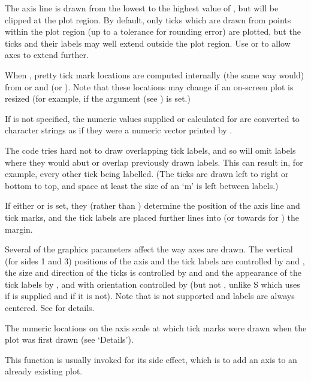 \begin{Details}\relax
The axis line is drawn from the lowest to the highest value of
, but will be clipped at the plot region.  By default, only
ticks which are drawn from points within the plot region (up to a
tolerance for rounding error) are plotted, but the ticks and their
labels may well extend outside the plot region.  Use 
or  to allow axes to extend further.

When , pretty tick mark locations are computed internally
(the same way  would) from
 or  and
 (or ).  Note that these
locations may change if an on-screen plot is resized (for example, if
the  argument  (see ) is set.)

If  is not specified, the numeric values supplied or
calculated for  are converted to character strings as if they
were a numeric vector printed by .

The code tries hard not to draw overlapping tick labels, and so will
omit labels where they would abut or overlap previously drawn labels.
This can result in, for example, every other tick being labelled.
(The ticks are drawn left to right or bottom to top, and space at
least the size of an `m' is left between labels.)

If either  or  is set, they (rather than
) determine the position of the axis line and tick
marks, and the tick labels are placed  further
lines into (or towards for ) the margin.

Several of the graphics parameters affect the way axes are drawn. The
vertical (for sides 1 and 3) positions of the axis and the tick labels
are controlled by  and , the size and
direction of the ticks is controlled by  and  and
the appearance of the tick labels by , 
and  with orientation controlled by  (but
not , unlike S which uses  if  is
supplied and  if it is not).  Note that  is not
supported and labels are always centered.  See  for details.
\end{Details}
%
\begin{Value}
The numeric locations on the axis scale at which tick marks were drawn
when the plot was first drawn (see `Details').

This function is usually invoked for its side effect, which is to add
an axis to an already existing plot.
\end{Value}
